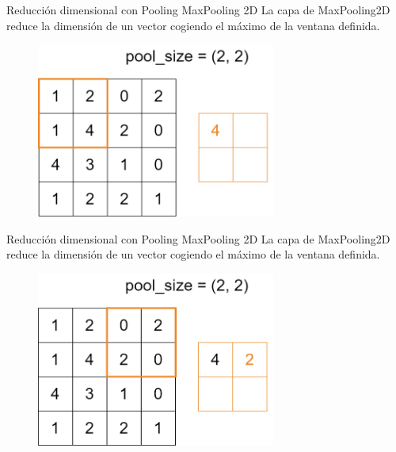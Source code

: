 \begin{frame}{Reducción dimensional con Pooling}
\alert{\Large MaxPooling 2D}
La capa de MaxPooling2D reduce la dimensión de un vector cogiendo el \alert{máximo} de la ventana definida.

\begin{figure}
    \centering
    \includegraphics[width=0.7\textwidth]{figures/Tema 3/MaxPooling_2.png}
\end{figure}
\end{frame}

\begin{frame}{Reducción dimensional con Pooling}
\alert{\Large MaxPooling 2D}
La capa de MaxPooling2D reduce la dimensión de un vector cogiendo el \alert{máximo} de la ventana definida.

\begin{figure}
    \centering
    \includegraphics[width=0.7\textwidth]{figures/Tema 3/MaxPooling_3.png}
\end{figure}
\end{frame}

